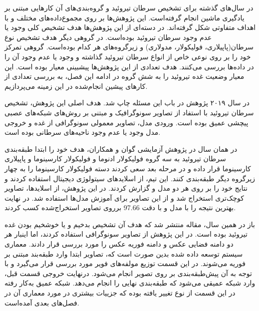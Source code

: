 در سال‌های گذشته برای تشخیص سرطان تیروئید و گروه‌بندی‌های آن‌ کارهایی مبتنی بر یادگیری ماشین انجام گرفته‌است.
این پژوهش‌ها بر روی مجموع‌داده‌های مختلف و با اهداف متفاوتی شکل گرفته‌اند.
در دسته‌ای از این ‍‍پژوهش‌ها هدف تشخیص کلی وجود یا عدم وجود سرطان تیروئید بوده‌است.
در گروهی دیگر هدف تشخیص نوع سرطان(پاپیلاری، فولیکولار، مدولاری) و زیر‌گروه‌های هر کدام بوده‌است.
گروهی تمرکز خود را بر روی نوعی خاص از انواع سرطان تیروئید گذاشته و وجود یا عدم وجود آن را در داده‌ها بررسی می‌کنند.
هدف تعدادی از این پژوهش‌ها پیشبینی معیار  بوده است. این معیار وضعیت غده تیروئید را به شش گروه 
در ادامه این فصل، به بررسی تعدادی از کارهای پیشین انجام‌شده در این زمینه می‌پردازیم.

در سال ۲۰۱۹ پژوهش \cite{li2019diagnosis} در باب این مسئله چاپ شد.
هدف اصلی این پژوهش، تشخیص سرطان تیروئید با استفاد از تصاویر سونوگرافیک و مبتنی بر روش‌های شبکه‌های عصبی پیچشی عمیق بوده است. ورودی مدل، تصاویر معمولی سونوگرافی از غده و خروجی مدل وجود یا عدم وجود ناحیه‌های سرطانی بوده ‌است.

در همان سال در پژوهش آزمایشی \cite{guan2019deep} گوان و همکاران، هدف خود را ابتدا طبقه‌بندی سرطان تیروئید به سه گروه فولیکولار ادنوما و فولیکولار کارسینوما و پاپیلاری کارسینوما قرار داده و در مرحله بعد سعی کردند دسته فولیکولار کارسینوما را به چهار زیر‌گروه دیگر طبقه‌بندی کنند. این تیم، از اسلاید‌های سیتولوژی دیجیتال استفاده کردند و نتایج خود را بر روی هر دو مدل  و  گزارش کردند.
در این پژوهش، از اسلاید‌ها، تصاویر کوچک‌تری استخراج شد و از این تصاویر برای آموزش مدل‌ها استفاده شد. 
در نهایت بهترین نتیجه را با مدل  و با دقت 97.66 برروی تصاویر استخراج‌شده کسب کردند.

باز در همین سال، مقاله \cite{nguyen2019artificial} منتشر شد که هدف آن تشخیص بد‌خیم و یا خوشخیم بودن غده تیروئید بوده است.
در این پژوهش از تصاویر سونوگرافی استفاده کردند، اما اینبار هر دو دامنه فضایی عکس و دامنه فوریه عکس را مورد بررسی قرار دادند.
معماری سیستم توسعه داده شده بدین صورت است که، تصاویر ابتدا وارد طبقه‌بند مبتنی بر فوریه می‌شوند.
در این قسمت توزیع مولفه‌های فویر مورد بررسی قرار می‌گیرد و با توجه به آن پیش‌طبقه‌بندی بر روی تصویر انجام می‌شود.
درنهایت خروجی قسمت قبل، وارد شبکه عمیقی می‌شود که طبقه‌بندی نهایی را انجام می‌دهد.
شبکه عمیق به‌کار رفته در این قسمت از نوع  تغییر یافته بوده که جزییات بیشتری در مورد معماری آن در فصل‌های بعدی آمده‌است.

